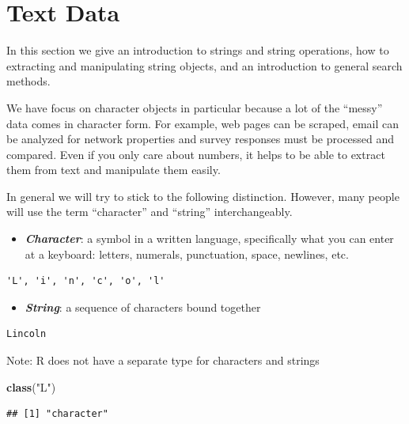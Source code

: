 \documentclass[
]{book}
\newenvironment{Shaded}{\begin{snugshade}}{\end{snugshade}}
\newcommand{\KeywordTok}[1]{\textcolor[rgb]{0.13,0.29,0.53}{\textbf{#1}}}
\newcommand{\NormalTok}[1]{#1}
\newcommand{\StringTok}[1]{\textcolor[rgb]{0.31,0.60,0.02}{#1}}
\providecommand{\tightlist}{%
  \setlength{\itemsep}{0pt}\setlength{\parskip}{0pt}}
\begin{document}
\hypertarget{text-data}{%
\chapter{Text Data}\label{text-data}}

In this section we give an introduction to strings and string operations, how to extracting and manipulating string objects, and an introduction to general search methods.

We have focus on character objects in particular because a lot of the ``messy'' data comes in character form. For example, web pages can be scraped, email can be analyzed for network properties and survey responses must be processed and compared. Even if you only care about numbers, it helps to be able to extract them from text and manipulate them easily.

In general we will try to stick to the following distinction. However, many people will use the term ``character'' and ``string'' interchangeably.

\begin{itemize}
\tightlist
\item
  \textbf{\emph{Character}}: a symbol in a written language, specifically what you can enter at a keyboard: letters, numerals, punctuation, space, newlines, etc.
\end{itemize}

\begin{verbatim}
'L', 'i', 'n', 'c', 'o', 'l'
\end{verbatim}

\begin{itemize}
\tightlist
\item
  \textbf{\emph{String}}: a sequence of characters bound together
\end{itemize}

\begin{verbatim}
Lincoln
\end{verbatim}

Note: R does not have a separate type for characters and strings

\begin{Shaded}
\begin{Highlighting}[]
\KeywordTok{class}\NormalTok{(}\StringTok{"L"}\NormalTok{)}
\end{Highlighting}
\end{Shaded}

\begin{verbatim}
## [1] "character"
\end{verbatim}
\end{document}

